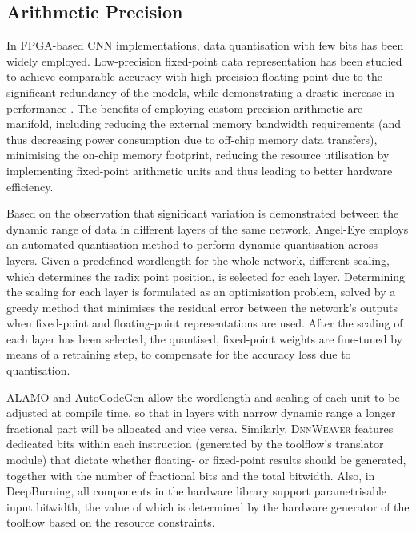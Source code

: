 \documentclass[format=acmsmall, review=false, screen=true]{acmart}
\begin{document}
\subsection{Arithmetic Precision}

In FPGA-based CNN implementations, data quantisation with few bits has been widely employed. Low-precision fixed-point data representation has been studied to achieve comparable accuracy with high-precision floating-point due to the significant redundancy of the models, while demonstrating a drastic increase in performance \cite{Suda_2016}. The benefits of employing custom-precision arithmetic are manifold, including reducing the external memory bandwidth requirements (and thus decreasing power consumption due to off-chip memory data transfers), minimising the on-chip memory footprint, reducing the resource utilisation by implementing fixed-point arithmetic units and thus leading to better hardware efficiency. 

Based on the observation that significant variation is demonstrated between the dynamic range of data in different layers of the same network, Angel-Eye {\color{black}employs an automated quantisation method to perform dynamic quantisation across layers.} Given a predefined wordlength for the whole network, different scaling, which determines the radix point position, is selected for each layer. Determining the scaling for each layer is formulated as an optimisation problem, solved by a greedy method that minimises the residual error between the network's outputs when fixed-point and floating-point representations are used. {\color{black}After the scaling of each layer has been selected, the quantised, fixed-point weights are fine-tuned by means of a retraining step, to compensate for the accuracy loss due to quantisation.}

ALAMO {\color{black}and AutoCodeGen} allow the wordlength and scaling of each unit to be adjusted at compile time, so that in layers with narrow dynamic range a longer fractional part will be allocated and vice versa. Similarly, \textsc{DnnWeaver} features dedicated bits within each instruction %
(generated by the toolflow's translator module) that dictate whether floating- or fixed-point results should be generated, together with the number of fractional bits and the total bitwidth. Also, in DeepBurning, all components in the hardware library support parametrisable input bitwidth, the value of which is determined by the hardware generator of the toolflow based on the resource constraints.
\end{document}
